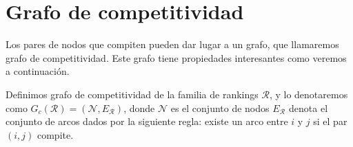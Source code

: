 \section{Grafo de competitividad}
Los pares de nodos que compiten pueden dar lugar a un grafo, que llamaremos grafo de competitividad. Este grafo tiene propiedades interesantes como veremos a continuación.

\begin{defi}
Definimos grafo de competitividad de la familia de rankings $\mathcal{R}$, y lo denotaremos como $G_c(\mathcal{R}) = (\mathcal{N}, E_\mathcal{R})$, donde $\mathcal{N}$ es el conjunto de nodos $E_\mathcal{R}$ denota el conjunto de arcos dados por la siguiente regla: existe un arco entre $i$ y $j$ si el par $(i,j)$ compite.
\end{defi}

